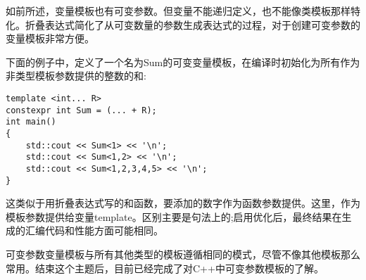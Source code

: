 如前所述，变量模板也有可变参数。但变量不能递归定义，也不能像类模板那样特化。折叠表达式简化了从可变数量的参数生成表达式的过程，对于创建可变参数的变量模板非常方便。

下面的例子中，定义了一个名为Sum的可变变量模板，在编译时初始化为所有作为非类型模板参数提供的整数的和:

\begin{lstlisting}[style=styleCXX]
template <int... R>
constexpr int Sum = (... + R);
int main()
{
	std::cout << Sum<1> << '\n';
	std::cout << Sum<1,2> << '\n';
	std::cout << Sum<1,2,3,4,5> << '\n';
}
\end{lstlisting}

这类似于用折叠表达式写的和函数，要添加的数字作为函数参数提供。这里，作为模板参数提供给变量template。区别主要是句法上的;启用优化后，最终结果在生成的汇编代码和性能方面可能相同。

可变参数变量模板与所有其他类型的模板遵循相同的模式，尽管不像其他模板那么常用。结束这个主题后，目前已经完成了对C++中可变参数模板的了解。















































